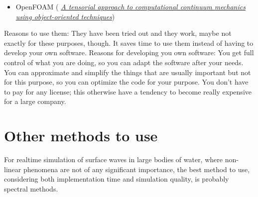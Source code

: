 \begin{itemize}
    \item OpenFOAM ( \textit{\href{http://powerlab.fsb.hr/ped/kturbo/openfoam/docs/foam.pdf}{A tensorial approach to computational continuum mechanics using object-oriented techniques}})
\end{itemize}

Reasons to use them: They have been tried out and they work, maybe not exactly for these purposes, though. It saves time to use them instead of having to develop your own software. Reasons for developing you own software: You get full control of what you are doing, so you can adapt the software after your needs. You can approximate and simplify the things that are usually important but not for this purpose, so you can optimize the code for your purpose. You don't have to pay for any license; this otherwise have a tendency to become really expensive for a large company.

\section{Other methods to use}

For realtime simulation of surface waves in large bodies of water, where non-linear phenomena are not of any significant importance, the best method to use, considering both implementation time and simulation quality, is probably spectral methods.
